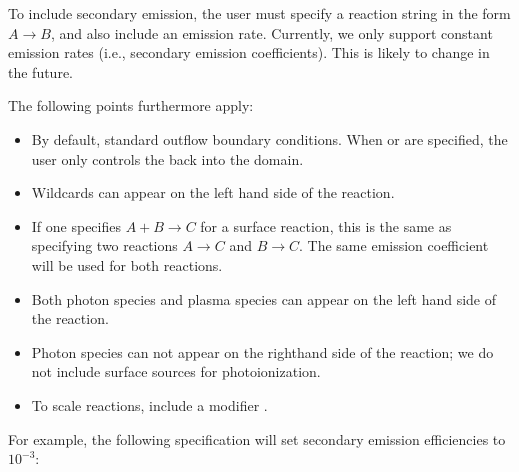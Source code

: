 \documentclass[letterpaper,10pt,english]{sphinxmanual}
\begin{document}
To include secondary emission, the user must specify a reaction string in the form \(A \rightarrow B\), and also include an emission rate.
Currently, we only support constant emission rates (i.e., secondary emission coefficients).
This is likely to change in the future.

The following points furthermore apply:
\begin{itemize}
\item {} 
By default, standard outflow boundary conditions.
When  or  are specified, the user only controls the  back into the domain.

\item {} 
Wildcards can appear on the left hand side of the reaction.

\item {} 
If one specifies \(A + B \rightarrow C\) for a surface reaction, this is the same as specifying two reactions \(A \rightarrow C\) and \(B\rightarrow C\).
The same emission coefficient will be used for both reactions.

\item {} 
Both photon species and plasma species can appear on the left hand side of the reaction.

\item {} 
Photon species can not appear on the right\sphinxhyphen{}hand side of the reaction; we do not include surface sources for photoionization.

\item {} 
To scale reactions, include a modifier .

\end{itemize}

For example, the following specification will set secondary emission efficiencies to \(10^{-3}\):
\end{document}
